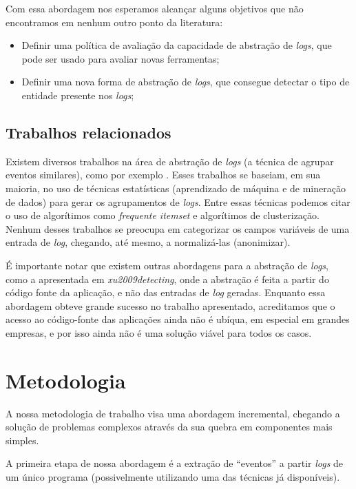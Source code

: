 \documentclass[
	12pt,				%
	openright,			%
	twoside,			%
	a4paper,			%
	english,			%
	spanish,			%
	brazil,				%
	]{abntex2}
\begin{document}
Com essa abordagem nos esperamos alcançar alguns objetivos que não encontramos em nenhum outro ponto da literatura:

\begin{itemize}
	\item Definir uma política de avaliação da capacidade de abstração de \emph{logs}, que pode ser usado para avaliar novas ferramentas;
	\item Definir uma nova forma de abstração de \emph{logs}, que consegue detectar o tipo de entidade presente nos \emph{logs};
\end{itemize}

\subsection{Trabalhos relacionados}
Existem diversos trabalhos na área de abstração de \emph{logs} (a técnica de agrupar eventos similares), como por exemplo \cite{jian2008automated, nagappan2010abstracting, vaarandi2003data}. Esses trabalhos se baseiam, em sua maioria, no uso de técnicas estatísticas (aprendizado de máquina e de mineração de dados) para gerar os agrupamentos de \emph{logs}. Entre essas técnicas podemos citar o uso de algorítimos como \emph{frequente itemset} e algorítimos de clusterização. Nenhum desses trabalhos se preocupa em categorizar os campos variáveis de uma entrada de \emph{log}, chegando, até mesmo, a normalizá-las (anonimizar).

É importante notar que existem outras abordagens para a abstração de \emph{logs}, como a apresentada em \emph{xu2009detecting}, onde a abstração é feita a partir do código fonte da aplicação, e não das entradas de \emph{log} geradas. Enquanto essa abordagem obteve grande sucesso no trabalho apresentado, acreditamos que o acesso ao código-fonte das aplicações ainda não é ubíqua, em especial em grandes empresas, e por isso ainda não é uma solução viável para todos os casos. 

\section{Metodologia}

A nossa metodologia de trabalho visa uma abordagem incremental, chegando a solução de problemas complexos através da sua quebra em componentes mais simples.

A primeira etapa de nossa abordagem é a extração de ``eventos'' a partir \emph{logs} de um único programa (possivelmente utilizando uma das técnicas já disponíveis).
\end{document}
